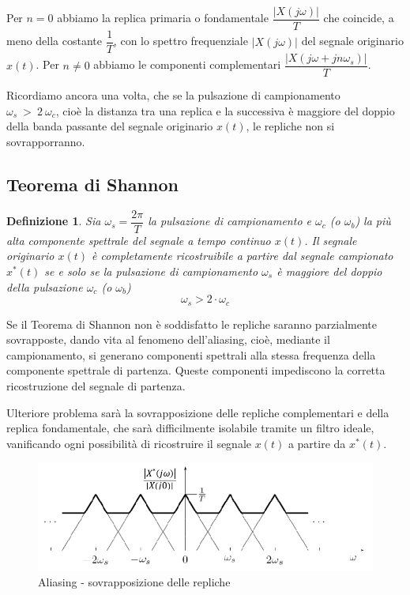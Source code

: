 \documentclass[a4paper]{report}
\newtheorem{definizione}{Definizione}
\begin{document}
Per $n = 0$ abbiamo la replica primaria o
fondamentale $\dfrac{|X(j \omega)|}{T}$
che coincide, a meno della costante $\dfrac{1}{T}$, con lo spettro
frequenziale $|X(j \omega)|$ del segnale originario $x(t)$. Per $n
\neq 0$ abbiamo le componenti complementari $\dfrac{|X(j \omega + j n
  \omega_s)|}{T}$.

Ricordiamo ancora una volta, che se la pulsazione di campionamento\\
$\omega_s~>~2~\omega_c$, cio\`e la distanza tra una replica e la
successiva \`e maggiore del doppio della banda passante del segnale
originario $x(t)$, le repliche non si sovrapporranno.

\subsection{Teorema di Shannon}
\begin{definizione}
  Sia $\omega_s = \dfrac{2 \pi}{T}$ la pulsazione di campionamento e
  $\omega_c$ (o $\omega_b$) la pi\`u alta componente spettrale del
  segnale a tempo continuo $x(t)$. Il segnale originario $x(t)$ \`e
  completamente ricostruibile a partire dal segnale campionato
  $x^{*}(t)$ se e solo se la pulsazione di campionamento $\omega_s$
  \`e maggiore del doppio della pulsazione $\omega_c$ (o $\omega_b$)
  \[
  \omega_s > 2\cdot \omega_c
  \]
\end{definizione}

Se il Teorema di Shannon non \`e soddisfatto le repliche saranno
parzialmente sovrapposte, dando vita al fenomeno
dell'aliasing, cio\`e, mediante il campionamento, si
generano componenti spettrali alla stessa frequenza della componente
spettrale di partenza. Queste componenti impediscono la corretta
ricostruzione del segnale di partenza.

Ulteriore problema sar\`a la sovrapposizione delle repliche
complementari e della replica fondamentale, che sar\`a difficilmente
isolabile tramite un filtro ideale, vanificando ogni possibilit\`a di
ricostruire il segnale $x(t)$ a partire da $x^{*}(t)$. 
\begin{figure}[!h]
  \begin{center}
    \includegraphics[scale=0.3]{./figures/aliasing.png}
    \caption{Aliasing - sovrapposizione delle
      repliche}\label{fig:aliasing} 
  \end{center}
\end{figure}
\end{document}
